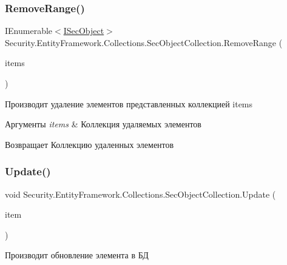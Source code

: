 \subsubsection{\texorpdfstring{Remove\+Range()}{RemoveRange()}}
{\footnotesize\ttfamily I\+Enumerable$<$\hyperlink{interface_security_1_1_interfaces_1_1_model_1_1_i_sec_object}{I\+Sec\+Object}$>$ Security.\+Entity\+Framework.\+Collections.\+Sec\+Object\+Collection.\+Remove\+Range (\begin{DoxyParamCaption}\item[{I\+Enumerable$<$ \hyperlink{interface_security_1_1_interfaces_1_1_model_1_1_i_sec_object}{I\+Sec\+Object} $>$}]{items }\end{DoxyParamCaption})}



Производит удаление элементов представленных коллекцией items 


\begin{DoxyParams}{Аргументы}
{\em items} & Коллекция удаляемых элементов\\
\hline
\end{DoxyParams}
\begin{DoxyReturn}{Возвращает}
Коллекцию удаленных элементов
\end{DoxyReturn}
\mbox{\label{class_security_1_1_entity_framework_1_1_collections_1_1_sec_object_collection_a4dc14e0cfa65f7365aeaa00733299a0f}} 
\subsubsection{\texorpdfstring{Update()}{Update()}}
{\footnotesize\ttfamily void Security.\+Entity\+Framework.\+Collections.\+Sec\+Object\+Collection.\+Update (\begin{DoxyParamCaption}\item[{\hyperlink{interface_security_1_1_interfaces_1_1_model_1_1_i_sec_object}{I\+Sec\+Object}}]{item }\end{DoxyParamCaption})}



Производит обновление элемента в БД 


